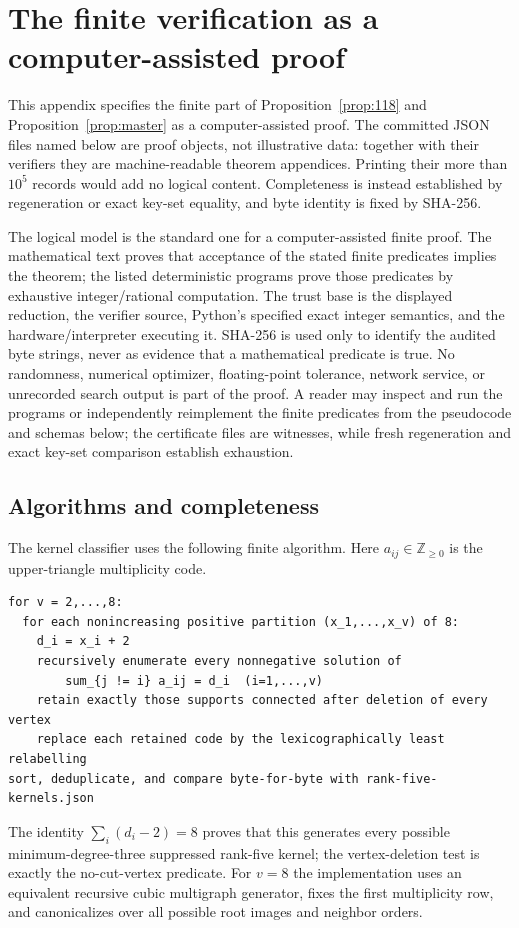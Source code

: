 \documentclass[11pt]{article}
\theoremstyle{remark}
\begin{document}
\appendix
\section{The finite verification as a computer-assisted proof}
\label{app:verification}

This appendix specifies the finite part of Proposition~\ref{prop:118} and
Proposition~\ref{prop:master} as a computer-assisted proof.  The committed JSON
files named below are proof objects, not illustrative data: together with their
verifiers they are machine-readable theorem appendices.  Printing their more
than $10^5$ records would add no logical content.  Completeness is instead
established by regeneration or exact key-set equality, and byte identity is
fixed by SHA-256.

The logical model is the standard one for a computer-assisted finite proof.
The mathematical text proves that acceptance of the stated finite predicates
implies the theorem; the listed deterministic programs prove those predicates
by exhaustive integer/rational computation.  The trust base is the displayed
reduction, the verifier source, Python's specified exact integer semantics, and
the hardware/interpreter executing it.  SHA-256 is used only to identify the
audited byte strings, never as evidence that a mathematical predicate is true.
No randomness, numerical optimizer, floating-point tolerance, network service,
or unrecorded search output is part of the proof.  A reader may inspect and run
the programs or independently reimplement the finite predicates from the
pseudocode and schemas below; the certificate files are witnesses, while fresh
regeneration and exact key-set comparison establish exhaustion.

\subsection{Algorithms and completeness}

The kernel classifier uses the following finite algorithm.  Here
$a_{ij}\in\mathbb Z_{\ge0}$ is the upper-triangle multiplicity code.
\begin{verbatim}
for v = 2,...,8:
  for each nonincreasing positive partition (x_1,...,x_v) of 8:
    d_i = x_i + 2
    recursively enumerate every nonnegative solution of
        sum_{j != i} a_ij = d_i  (i=1,...,v)
    retain exactly those supports connected after deletion of every vertex
    replace each retained code by the lexicographically least relabelling
sort, deduplicate, and compare byte-for-byte with rank-five-kernels.json
\end{verbatim}
The identity $\sum_i(d_i-2)=8$ proves that this generates every possible
minimum-degree-three suppressed rank-five kernel; the vertex-deletion test is
exactly the no-cut-vertex predicate.  For $v=8$ the implementation uses an
equivalent recursive cubic multigraph generator, fixes the first multiplicity
row, and canonicalizes over all possible root images and neighbor orders.
\end{document}

